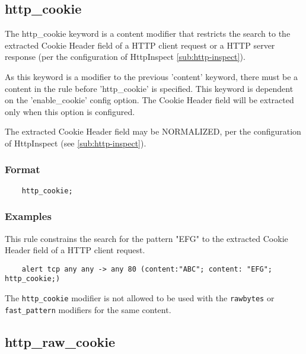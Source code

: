 \documentclass[english]{report}
\newenvironment{note}{
\samepage
    \vspace{10pt}{\textsf{
        {\hspace{7pt}\Huge{$\triangle$\hspace{-12.5pt}{\Large{$^!$}}}}\hspace{5pt}
        {\Large{NOTE}}
    }
    }
   \begin{center}
    \par\vspace{-17pt}

    \begin{lrbox}{\savepar}
    \begin{minipage}[r]{6in}
}
{
    \end{minipage}
    \end{lrbox}
    \fbox{
        \usebox{
            \savepar
	}
    }
    \par\vskip10pt
    \end{center}
}
\newenvironment{note}{
        \begin{rawhtml}
        <p><table border="1"><tr><td><b>
        Note:&nbsp;&nbsp;</b>
        \end{rawhtml}
}{
        \begin{rawhtml}
        </b></td></tr></table></p>
        \end{rawhtml}
}
\begin{document}
\subsection{http\_cookie}
\label{sub:HttpCookie}

The http\_cookie keyword is a content modifier that restricts the search to the
extracted Cookie Header field of a HTTP client request or a HTTP server 
response (per the configuration of HttpInspect \ref{sub:http-inspect}).

As this keyword is a modifier to the previous 'content' keyword, there must be
a content in the rule before 'http\_cookie' is specified. This keyword is dependent
on the 'enable\_cookie' config option. The Cookie Header field will be extracted only
when this option is configured.

The extracted Cookie Header field may be NORMALIZED, per the configuration of
HttpInspect (see \ref{sub:http-inspect}).

\subsubsection{Format}

\begin{verbatim}
    http_cookie;
\end{verbatim}

\subsubsection{Examples}

This rule constrains the search for the pattern "EFG" to the extracted Cookie
Header field of a HTTP client request.

\begin{verbatim}
    alert tcp any any -> any 80 (content:"ABC"; content: "EFG"; http_cookie;)
\end{verbatim}

\begin{note}

The \texttt{http\_cookie} modifier is not allowed to be used with the
\texttt{rawbytes} or \texttt{fast\_pattern} modifiers for the same content.

\end{note}

\subsection{http\_raw\_cookie}
\label{sub:RawHttpCookie}
\end{document}
